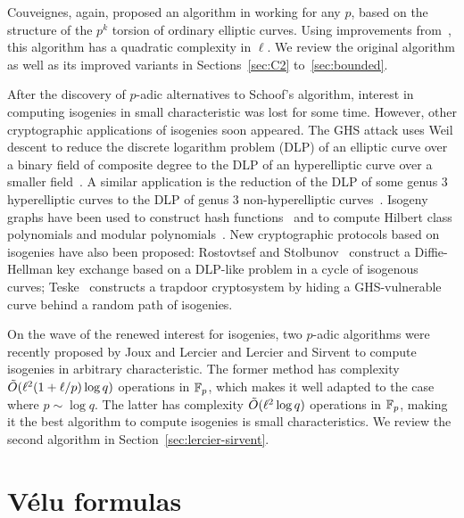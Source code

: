 Couveignes, again, proposed an algorithm in \cite{couveignes96}
working for any $p$, based on the structure of the $p^k$ torsion of
ordinary elliptic curves. Using improvements
from~\cite{couveignes00,df+schost09,df10}, this algorithm has a
quadratic complexity in $\ell$. We review the original algorithm as
well as its improved variants in Sections~\ref{sec:C2}
to~\ref{sec:bounded}.

After the discovery of $p$-adic alternatives to Schoof's
algorithm\cite{satoh00,fouquet+gaudry+harley00}, interest in computing
isogenies in small characteristic was lost for some time. However,
other cryptographic applications of isogenies soon appeared.  The
GHS attack uses Weil descent to reduce the
discrete logarithm problem
(DLP) of an elliptic curve
over a binary field of composite degree to the DLP of an hyperelliptic
curve over a smaller field~\cite{gaudry+hess+smart02,GHS,hess03}. A
similar application is the reduction of the DLP of some genus $3$
hyperelliptic curves to the DLP of genus $3$ non-hyperelliptic
curves~\cite{smith09}. Isogeny graphs have been used to construct hash
functions~\cite{charles+lauter+goren09} and to compute Hilbert class
polynomials and modular
polynomials~\cite{sutherland10:hilbert,sutherland10:modpol}. New
cryptographic protocols based on isogenies have also been proposed:
Rostovtsef and Stolbunov~\cite{rostovtsev+stolbunov06} construct a
Diffie-Hellman key exchange based on a DLP-like problem in a cycle of
isogenous curves; Teske~\cite{mauer+menezes+teske01,teske06}
constructs a trapdoor cryptosystem by hiding a GHS-vulnerable curve
behind a random path of isogenies.

On the wave of the renewed interest for isogenies, two $p$-adic
algorithms were recently proposed by Joux and Lercier
\cite{joux+lercier06} and Lercier and Sirvent \cite{lercier+sirvent08}
to compute isogenies in arbitrary characteristic. The former method
has complexity $\tilde{O}(\ell^2(1 + \ell/p)\log q)$ operations in
$\mathbb{F}_p$, which makes it well adapted to the case where $p\sim\log q$.
The latter has complexity $\tilde{O}(\ell^2\log q)$ operations in $\mathbb{F}_p$,
making it the best algorithm to compute isogenies is small
characteristics. We review the second algorithm in
Section~\ref{sec:lercier-sirvent}.


\section{Vélu formulas}
\label{sec:velu-formulas}


